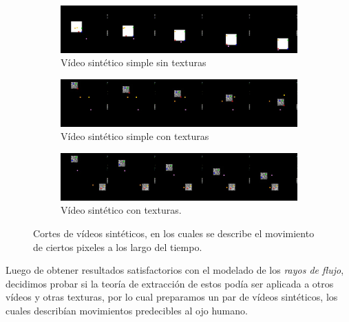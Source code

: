 \begin{figure}[t]
	\begin{subfigure}{1.0\textwidth}
		\centering
		\includegraphics[width=1\textwidth]{Figuras/resultados/videos_sinteticos/v1.png}
		\caption{Vídeo sintético simple sin texturas}
		\label{exp:fig:vs1}
	\end{subfigure}
	
	\begin{subfigure}{1.0\textwidth}
		\centering
		\includegraphics[width=1\textwidth]{Figuras/resultados/videos_sinteticos/v2.png}
		\caption{Vídeo sintético simple con texturas}
		\label{exp:fig:vs2}
	\end{subfigure}
	
	\begin{subfigure}{1.0\textwidth}
		\centering
		\includegraphics[width=1\textwidth]{Figuras/resultados/videos_sinteticos/v3.png}
		\caption{Vídeo sintético con texturas.}
		\label{exp:fig:vs3}
	\end{subfigure}
	\caption{Cortes de vídeos sintéticos, en los cuales se describe el movimiento de ciertos pixeles a los largo del tiempo.} 
	\label{exp:fig:vs}
\end{figure}


Luego de obtener resultados satisfactorios con el modelado de los \textit{rayos de flujo}, decidimos probar si la teoría de extracción de estos podía ser aplicada a otros vídeos y otras texturas, por lo cual preparamos un par de vídeos sintéticos, los cuales describían movimientos predecibles al ojo humano.

